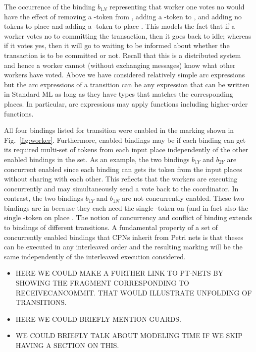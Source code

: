 The occurrence of the binding $b_{1N}$ representing that worker one
votes no would have the effect of removing a -token
from , adding a -token to
, and adding no tokens to place
 and adding a -token to place
. This models the fact that if a worker votes no to
committing the transaction, then it goes back to idle; whereas if it
votes yes, then it will go to waiting to be informed about whether the
transaction is to be committed or not.  Recall that this is a
distributed system and hence a worker cannot (without exchanging
messages) know what other workers have voted.  Above we have
considered relatively simple arc expressions but the arc expressions
of a transition can be any expression that can be written in Standard
ML as long as they have types that matches the corresponding
places. In particular, arc expressions may apply functions including
higher-order functions.

All four bindings listed for transition 
were enabled in the marking shown in
Fig.~\ref{fig:worker}. Furthermore, enabled bindings may be
 if each binding can get its required
multi-set of tokens from each input place independently of the other
enabled bindings in the set. As an example, the two bindings $b_{1Y}$
and $b_{2Y}$ are concurrent enabled since each binding can gets its
token from the input places without sharing with each other. This
reflects that the workers are executing concurrently and may
simultaneously send a vote back to the coordinator. In contrast, the
two bindings $b_{1Y}$ and $b_{1N}$ are not concurrently enabled. These
two bindings are in  because they each need the
single -token on  (and in fact also the
single -token on place . The notion
of concurrency and conflict of binding extends to bindings of
different transitions. A fundamental property of a set of concurrently
enabled bindings that CPNs inherit from Petri nets is that theses can
be executed in any interleaved order and the resulting marking will be
the same independently of the interleaved execution considered.

\begin{itemize}

\item HERE WE COULD MAKE A FURTHER LINK TO PT-NETS BY SHOWING THE
  FRAGMENT CORRESPONDING TO RECEIVECANCOMMIT. THAT WOULD ILLUSTRATE
  UNFOLDING OF TRANSITIONS.

\item HERE WE COULD BRIEFLY MENTION GUARDS. 

\item WE COULD BRIEFLY TALK ABOUT MODELING TIME IF WE SKIP HAVING
  A SECTION ON THIS.

\end{itemize}
